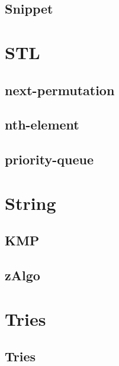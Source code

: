 \documentclass[a4paper, twocolumn]{article}
\begin{document}
\subsection{Snippet}

\section{STL}
\subsection{next-permutation}

\subsection{nth-element}

\subsection{priority-queue}

\section{String}
\subsection{KMP}

\subsection{zAlgo}

\section{Tries}
\subsection{Tries}

\end{document}
